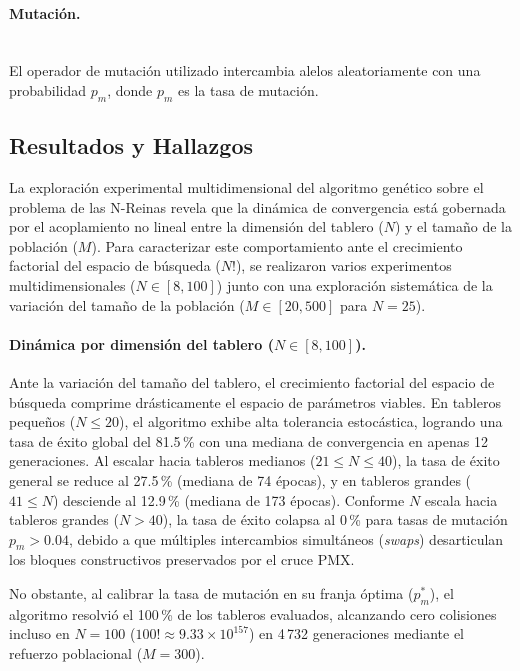 \documentclass[11pt,a4paper,twocolumn]{article}
\begin{document}
\paragraph{Mutación.} ~\\
El operador de mutación utilizado intercambia alelos aleatoriamente con una probabilidad $p_m$, donde $p_m$ es la tasa de mutación. 

\subsection{Resultados y Hallazgos}

La exploración experimental multidimensional del algoritmo genético sobre el problema de las N-Reinas revela que la dinámica de convergencia está gobernada por el acoplamiento no lineal entre la dimensión del tablero ($N$) y el tamaño de la población ($M$). Para caracterizar este comportamiento ante el crecimiento factorial del espacio de búsqueda ($N!$), se realizaron varios experimentos multidimensionales ($N \in [8, 100]$) junto con una exploración sistemática de la variación del tamaño de la población ($M \in [20, 500]$ para $N=25$).

\paragraph{Dinámica por dimensión del tablero ($N \in [8, 100]$).}
Ante la variación del tamaño del tablero, el crecimiento factorial del espacio de búsqueda comprime drásticamente el espacio de parámetros viables. En tableros pequeños ($N \le 20$), el algoritmo exhibe alta tolerancia estocástica, logrando una tasa de éxito global del 81.5\,\% con una mediana de convergencia en apenas 12 generaciones. Al escalar hacia tableros medianos ($21 \le N \le 40$), la tasa de éxito general se reduce al 27.5\,\% (mediana de 74 épocas), y en tableros grandes ($41 \le N$) desciende al 12.9\,\% (mediana de 173 épocas). Conforme $N$ escala hacia tableros grandes ($N > 40$), la tasa de éxito colapsa al 0\,\% para tasas de mutación $p_m > 0.04$, debido a que múltiples intercambios simultáneos (\textit{swaps}) desarticulan los bloques constructivos preservados por el cruce PMX.

No obstante, al calibrar la tasa de mutación en su franja óptima ($p_m^*$), el algoritmo resolvió el 100\,\% de los tableros evaluados, alcanzando cero colisiones incluso en $N=100$ ($100! \approx 9.33 \times 10^{157}$) en 4\,732 generaciones mediante el refuerzo poblacional ($M=300$). 
\end{document}
